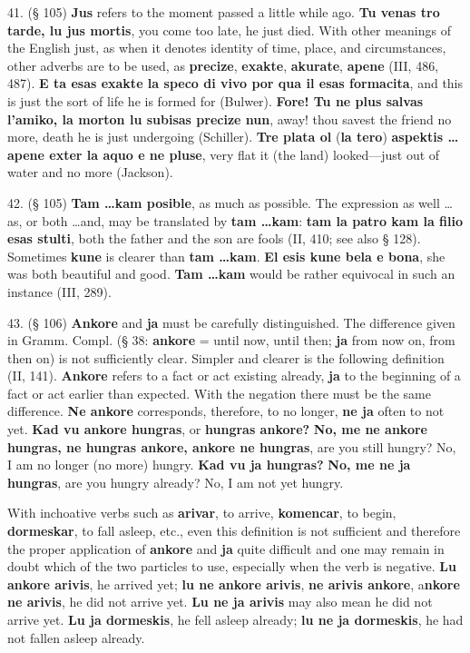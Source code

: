 41. (§ 105) \textbf{Jus} refers to the moment passed a little while ago. \textbf{Tu venas tro tarde, lu jus mortis}, you come too late, he just died. With other meanings of the English just, as when it denotes identity of time, place, and circumstances, other adverbs are to be used, as \textbf{precize}, \textbf{exakte}, \textbf{akurate}, \textbf{apene} (III, 486, 487). \textbf{E ta esas exakte la speco di vivo por qua il esas formacita}, and this is just the sort of life he is formed for (Bulwer). \textbf{Fore! Tu ne plus salvas l'amiko, la morton lu subisas precize nun}, away! thou savest the friend no more, death he is just undergoing (Schiller). \textbf{Tre plata ol }(\textbf{la tero})\textbf{ aspektis \ldots apene exter la aquo e ne pluse}, very flat it (the land) looked—just out of water and no more (Jackson). %

42. (§ 105) \textbf{Tam \ldots kam posible}, as much as possible. The expression as well \ldots as, or both \ldots and, may be translated by \textbf{tam \ldots kam}: \textbf{tam la patro kam la filio esas stulti}, both the father and the son are fools (II, 410; see also § 128). Sometimes \textbf{kune} is clearer than \textbf{tam \ldots kam}. \textbf{El esis kune bela e bona}, she was both beautiful and good. \textbf{Tam \ldots kam} would be rather equivocal in such an instance (III, 289). %

43. (§ 106) \textbf{Ankore} and \textbf{ja} must be carefully distinguished. The difference given in Gramm. Compl. (§ 38: \textbf{ankore} = until now, until then; \textbf{ja} from now on, from then on) is not sufficiently clear. Simpler and clearer is the following definition (II, 141). \textbf{Ankore} refers to a fact or act existing already, \textbf{ja} to the beginning of a fact or act earlier than expected. With the negation there must be the same difference. \textbf{Ne ankore} corresponds, therefore, to no longer, \textbf{ne ja} often to not yet. \textbf{Kad vu ankore hungras}, or \textbf{hungras ankore?} \textbf{No, me ne ankore hungras, ne hungras ankore, ankore ne hungras}, are you still hungry? No, I am no longer (no more) hungry. \textbf{Kad vu ja hungras?} \textbf{No, me ne ja hungras}, are you hungry already? No, I am not yet hungry. %

With inchoative verbs such as \textbf{arivar}, to arrive, \textbf{komencar}, to begin, \textbf{dormeskar}, to fall asleep, etc., even this definition is not sufficient and therefore the proper application of \textbf{ankore} and \textbf{ja} quite difficult and one may remain in doubt which of the two particles to use, especially when the verb is negative. \textbf{Lu ankore arivis}, he arrived yet; \textbf{lu ne ankore arivis}, \textbf{ne arivis ankore}, a\textbf{nkore ne arivis}, he did not arrive yet. \textbf{Lu ne ja arivis} may also mean he did not arrive yet. \textbf{Lu ja dormeskis}, he fell asleep already; \textbf{lu ne ja dormeskis}, he had not fallen asleep already.

